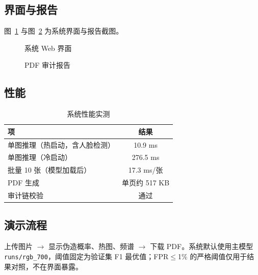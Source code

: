 \subsection{界面与报告}

图~\ref{fig:ui} 与图~\ref{fig:pdf} 为系统界面与报告截图。

\begin{figure}[H]
\centering
{}
\caption{系统 Web 界面}
\label{fig:ui}
\end{figure}

\begin{figure}[H]
\centering
{}
\caption{PDF 审计报告}
\label{fig:pdf}
\end{figure}

\subsection{性能}

\begin{table}[H]
\centering
\caption{系统性能实测}
\label{tab:perf}
\small
\begin{tabular}{lc}
\toprule
项 & 结果 \\
\midrule
单图推理（热启动，含人脸检测） & 10.9 ms \\
单图推理（冷启动） & 276.5 ms \\
批量 10 张（模型加载后） & 17.3 ms/张 \\
PDF 生成 & 单页约 517 KB \\
审计链校验 & 通过 \\
\bottomrule
\end{tabular}
\end{table}

\subsection{演示流程}

上传图片 $\rightarrow$ 显示伪造概率、热图、频谱 $\rightarrow$ 下载 PDF。系统默认使用主模型 \texttt{runs/rgb\_700}，阈值固定为验证集 F1 最优值；FPR$\le$1\% 的严格阈值仅用于结果对照，不在界面暴露。
